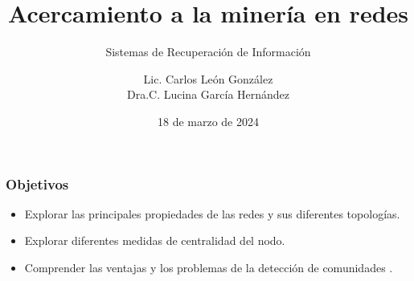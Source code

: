 \documentclass[
10pt, %
aspectratio=169, %
]{beamer}
\title[Short Title]{Acercamiento a la minería en redes}
\subtitle{Sistemas de Recuperación de Información}
\author{Lic. Carlos León González \\ Dra.C. Lucina García Hernández}
\institute[UC]{Facultad de Matem\'atica y Computaci\'on \\ Universidad de La Habana \\ \smallskip }
\date{18 de marzo de  2024} %
\begin{document}
	
	
	
	\begin{frame}
		\titlepage
	\end{frame}
	
	\begin{frame}
		
		\frametitle{Objetivos}
		
		\begin{itemize}

			\item Explorar las principales propiedades de las redes y sus diferentes topologías. \\[2mm]
			
			\item Explorar diferentes medidas de centralidad del nodo. \\[2mm]
			
			\item Comprender las ventajas y los problemas de la detección de comunidades .
			
		\end{itemize}
		
	\end{frame}
	
\end{document}
